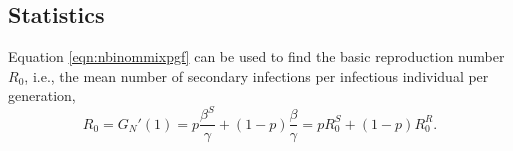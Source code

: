 \documentclass{imammb}
\numberwithin{equation}{section}
\newcommand{\comment}[1]{}
\begin{document}


\subsection{Statistics} %
Equation \eqref{eqn:nbinommixpgf} can be used to find the basic reproduction number $R_0$, i.e., the mean number of secondary infections per infectious individual per generation,  
\begin{equation}
   R_0= G_N'(1) = p\frac{ \beta^S }{\gamma } +(1-p)\frac{ \beta }  {\gamma  } = p R_0^S + (1-p) R_0^R.%
\end{equation}





\comment{
\begin{align*}
P(5 \text{ secondary infections }) &= P( \text{ 5 secondary infections from infectious individual in superspreading cohort}) \\&\text{ or } P( \text{ 5 secondary infections from infectious individual in regular cohort })\\
&=P(\text{choosing regular infectious individ})P(5 \text{ infections conditional on regular infectious individ})\\ &\text{or } P(\text{superspreading})P(5 \text{infections conditional on being from superspreading cohort}), 
\end{align*}
or expressed mathematically as,
\begin{align*}
    P(I=5) &=(1-p) P(I=5|\text{regular}) +p P(I=5|\text{superspreading}) \\
     &=p P(T=5|\mathcal{V}=\beta^D) +(1-p) P(T=5|\mathcal{V}=\beta^A)\\
     &=p \frac{(\beta^D)^5}{5!} e^{-\beta^D} +(1-p)\frac{(\beta^A)^5}{5!} e^{-\beta^A}.
\end{align*}
}
\end{document}
